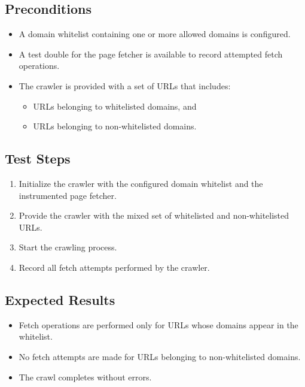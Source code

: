 \documentclass{article}
\begin{document}
\subsection*{Preconditions}
\begin{itemize}
  \item A domain whitelist containing one or more allowed domains is configured.
  \item A test double for the page fetcher is available to record attempted fetch operations.
  \item The crawler is provided with a set of URLs that includes:
    \begin{itemize}
      \item URLs belonging to whitelisted domains, and
      \item URLs belonging to non-whitelisted domains.
    \end{itemize}
\end{itemize}


\subsection*{Test Steps}
\begin{enumerate}
  \item Initialize the crawler with the configured domain whitelist and the instrumented page fetcher.
  \item Provide the crawler with the mixed set of whitelisted and non-whitelisted URLs.
  \item Start the crawling process.
  \item Record all fetch attempts performed by the crawler.
\end{enumerate}


\subsection*{Expected Results}
\begin{itemize}
  \item Fetch operations are performed only for URLs whose domains appear in the whitelist.
  \item No fetch attempts are made for URLs belonging to non-whitelisted domains.
  \item The crawl completes without errors.
\end{itemize}


\end{document}
